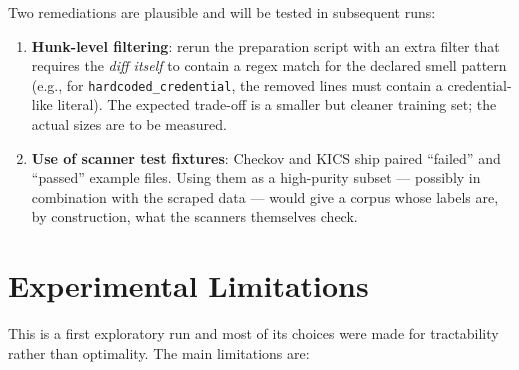 \documentclass[12pt, a4paper]{report}
\begin{document}
Two remediations are plausible and will be tested in subsequent runs:

\begin{enumerate}
  \item \textbf{Hunk-level filtering}: rerun the preparation script with
        an extra filter that requires the \emph{diff itself} to contain
        a regex match for the declared smell pattern (e.g., for
        \texttt{hardcoded\_credential}, the removed lines must contain
        a credential-like literal). The expected trade-off is a smaller
        but cleaner training set; the actual sizes are to be measured.
  \item \textbf{Use of scanner test fixtures}: Checkov and KICS ship
        paired ``failed'' and ``passed'' example files. Using them as a
        high-purity subset --- possibly in combination with the scraped
        data --- would give a corpus whose labels are, by construction,
        what the scanners themselves check.
\end{enumerate}

\section{Experimental Limitations}

This is a first exploratory run and most of its choices were made for
tractability rather than optimality. The main limitations are:
\end{document}
